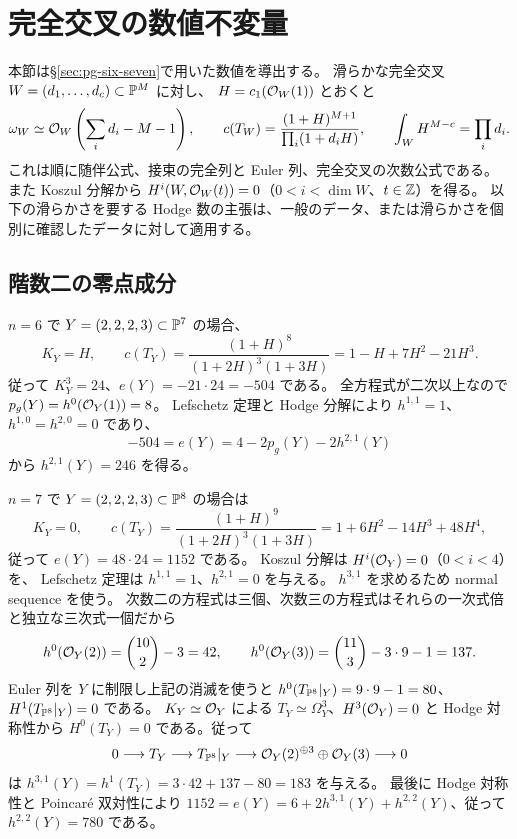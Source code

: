 \section{完全交叉の数値不変量}\label{sec:pg-numerical}
本節は\S\ref{sec:pg-six-seven}で用いた数値を導出する。
滑らかな完全交叉 $W=(d_1,\ldots,d_c)\subset\mathbb P^M$ に対し、
$H=c_1(\mathcal O_W(1))$ とおくと
\begin{equation}\label{eq:pg-ci-formulas}
\omega_W\simeq\mathcal O_W\left(\sum_i d_i-M-1\right),\qquad
c(T_W)=\frac{(1+H)^{M+1}}{\prod_i(1+d_iH)},\qquad
\int_W H^{M-c}=\prod_i d_i.
\end{equation}
これは順に随伴公式、接束の完全列と Euler 列、完全交叉の次数公式である。
また Koszul 分解から
$H^i(W,\mathcal O_W(t))=0$（$0<i<\dim W$、$t\in\mathbb Z$）を得る。
以下の滑らかさを要する Hodge 数の主張は、一般のデータ、または滑らかさを個別に確認したデータに対して適用する。

\subsection{階数二の零点成分}
$n=6$ で $Y=(2,2,2,3)\subset\mathbb P^7$ の場合、
\begin{equation}
K_Y=H,\qquad c(T_Y)=\frac{(1+H)^8}{(1+2H)^3(1+3H)}
=1-H+7H^2-21H^3.
\end{equation}
従って $K_Y^3=24$、$e(Y)=-21\cdot24=-504$ である。
全方程式が二次以上なので $p_g(Y)=h^0(\mathcal O_Y(1))=8$。
Lefschetz 定理と Hodge 分解により
$h^{1,1}=1$、$h^{1,0}=h^{2,0}=0$ であり、
\begin{equation}
-504=e(Y)=4-2p_g(Y)-2h^{2,1}(Y)
\end{equation}
から $h^{2,1}(Y)=246$ を得る。

$n=7$ で $Y=(2,2,2,3)\subset\mathbb P^8$ の場合は
\begin{equation}
K_Y=0,\qquad c(T_Y)=\frac{(1+H)^9}{(1+2H)^3(1+3H)}
=1+6H^2-14H^3+48H^4,
\end{equation}
従って $e(Y)=48\cdot24=1152$ である。
Koszul 分解は $H^i(\mathcal O_Y)=0$（$0<i<4$）を、
Lefschetz 定理は $h^{1,1}=1$、$h^{2,1}=0$ を与える。
$h^{3,1}$ を求めるため normal sequence を使う。
次数二の方程式は三個、次数三の方程式はそれらの一次式倍と独立な三次式一個だから
\begin{equation}
h^0(\mathcal O_Y(2))=\binom{10}{2}-3=42,\qquad
h^0(\mathcal O_Y(3))=\binom{11}{3}-3\cdot9-1=137.
\end{equation}
Euler 列を $Y$ に制限し上記の消滅を使うと
$h^0(T_{\mathbb P^8}|_Y)=9\cdot9-1=80$、$H^1(T_{\mathbb P^8}|_Y)=0$ である。
$K_Y\simeq\mathcal O_Y$ による $T_Y\simeq\Omega_Y^3$、$H^3(\mathcal O_Y)=0$ と Hodge 対称性から
$H^0(T_Y)=0$ である。従って
\begin{equation}
0\longrightarrow T_Y\longrightarrow T_{\mathbb P^8}|_Y
\longrightarrow\mathcal O_Y(2)^{\oplus3}\oplus\mathcal O_Y(3)\longrightarrow0
\end{equation}
は $h^{3,1}(Y)=h^1(T_Y)=3\cdot42+137-80=183$ を与える。
最後に Hodge 対称性と Poincar\'e 双対性により
$1152=e(Y)=6+2h^{3,1}(Y)+h^{2,2}(Y)$、従って $h^{2,2}(Y)=780$ である。

